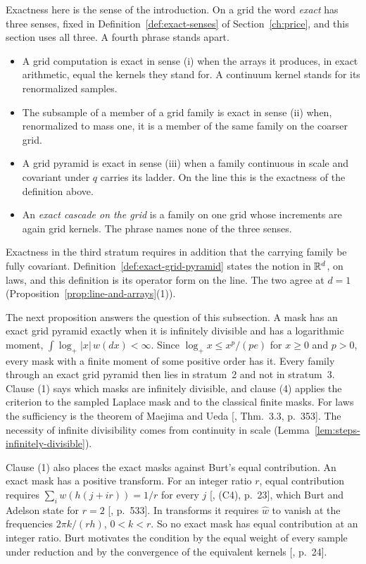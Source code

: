 Exactness here is the sense of the introduction. On a grid the word \emph{exact} has three senses,
fixed in Definition~\ref{def:exact-senses} of Section~\ref{ch:price}, and this section uses all
three. A fourth phrase stands apart.
\begin{itemize}
\item A grid computation is exact in sense (i) when the arrays it produces, in exact arithmetic,
equal the kernels they stand for. A continuum kernel stands for its renormalized samples.
\item The subsample of a member of a grid family is exact in sense (ii) when, renormalized to mass
one, it is a member of the same family on the coarser grid.
\item A grid pyramid is exact in sense (iii) when a family continuous in scale and covariant under
$q$ carries its ladder. On the line this is the exactness of the definition above.
\item An \emph{exact cascade on the grid} is a family on one grid whose increments are again grid
kernels. The phrase names none of the three senses.
\end{itemize}
Exactness in the third stratum requires in addition that the carrying family be fully covariant.
Definition~\ref{def:exact-grid-pyramid} states the notion in $\mathbb{R}^d$, on laws, and this definition
is its operator form on the line. The two agree at $d = 1$
(Proposition~\ref{prop:line-and-arrays}(1)).

The next proposition answers the question of this subsection. A mask has an exact grid pyramid
exactly when it is infinitely divisible and has a logarithmic moment,
$\int\log_+|x|\,w(dx) < \infty$. Since $\log_+x \le x^p/(pe)$ for $x \ge 0$ and $p > 0$, every
mask with a finite moment of some positive order has it. Every family through an exact grid pyramid then lies in stratum~2 and not in stratum~3. Clause (1)
says which masks are infinitely divisible, and clause (4) applies the criterion to the sampled
Laplace mask and to the classical finite masks. For laws the sufficiency is the theorem of Maejima
and Ueda [, Thm.~3.3, p.~353]. The necessity of infinite divisibility
comes from continuity in scale (Lemma~\ref{lem:steps-infinitely-divisible}).

Clause (1) also places the exact masks against Burt's equal contribution. An exact mask has a
positive transform. For an integer ratio $r$, equal contribution requires
$\sum_iw(h(j + ir)) = 1/r$ for every $j$ [, (C4), p.~23], which Burt and
Adelson state for $r = 2$ [, p.~533]. In transforms it requires
$\widehat w$ to vanish at the frequencies $2\pi k/(rh)$, $0 < k < r$. So no exact mask has equal
contribution at an integer ratio. Burt motivates the condition by the equal weight of every sample
under reduction and by the convergence of the equivalent kernels [, p.~24].

